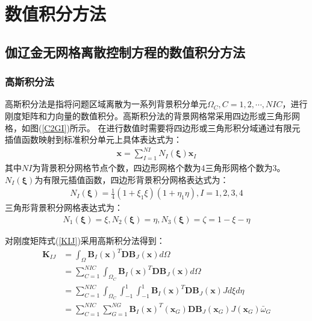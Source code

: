 \chapter{数值积分方法}
\section{伽辽金无网格离散控制方程的数值积分方法}
\subsection{高斯积分法}
高斯积分法是指将问题区域离散为一系列背景积分单元$\Omega_C,C=1,2,\dotsb,N\!I\!C$，进行刚度矩阵和力向量的数值积分。高斯积分法的背景网格常采用四边形或三角形网格，如图(\ref{C2GI})所示。
在进行数值时需要将四边形或三角形积分域通过有限元插值函数映射到标准积分单元上具体表达式为：
\begin{equation}
\begin{split}
    \pmb{x}=\sum_{I=1}^{N\!I}N_I(\pmb{\xi})\pmb{x}_I
\end{split}
\end{equation}
其中$N\!I$为背景积分网格节点个数，四边形网格个数为4三角形网格个数为3。$N_I(\pmb{\xi})$为有限元插值函数，四边形背景积分网格表达式为：
\begin{equation}
\begin{split}
    N_I(\pmb{\xi})=\frac{1}{4}(1+\xi_1\xi)(1+\eta_1\eta),I=1,2,3,4
\end{split}
\end{equation}
三角形背景积分网格表达式为：
\begin{equation}
\begin{split}
    N_1(\pmb{\xi})=\xi,N_2(\pmb{\xi})=\eta,N_3(\pmb{\xi})=\zeta=1-\xi-\eta    
\end{split}
\end{equation}\par
对刚度矩阵式(\ref{KIJ})采用高斯积分法得到：
\begin{equation}
\begin{split}
    \pmb{K}_{IJ}&=\int_{\Omega}\pmb{B}_I(\pmb{x})^T\pmb{D}\pmb{B}_J(\pmb{x})d\Omega\\
     &=\sum_{C=1}^{N\!I\!C}\int_{\Omega_C}\pmb{B}_I(\pmb{x})^T\pmb{D}\pmb{B}_J(\pmb{x})d\Omega\\
     &=\sum_{C=1}^{N\!I\!C}\int_{\Omega_C}\int_{-1}^1\int_{-1}^1\pmb{B}_I(\pmb{x})^T\pmb{D}\pmb{B}_J(\pmb{x})Jd\xi d\eta\\
     &=\sum_{C=1}^{N\!I\!C}\sum_{G=1}^{N\!G}\pmb{B}_I(\pmb{x})^T(\pmb{x}_G)\pmb{D}\pmb{B}_J(\pmb{x}_G)J(\pmb{x}_G)\bar{\omega}_G
\end{split}
\end{equation}
